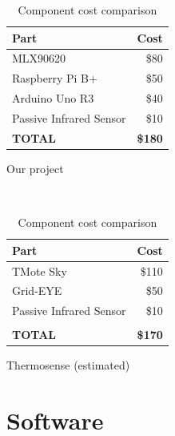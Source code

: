 \documentclass[../thesis/thesis.tex]{subfiles}
\begin{document}
\begin{table}
\centering
\begin{subtable}[b]{0.5\textwidth}
\centering
\begin{tabular}{|l|r|}
\hline
\textbf{Part} & \textbf{Cost} \\ \hline
MLX90620 & \$80 \\ \hline
Raspberry Pi B+ &  \$50 \\ \hline
Arduino Uno R3 & \$40 \\ \hline
Passive Infrared Sensor & \$10 \\ \hline
\textbf{TOTAL} & \textbf{\$180} \\ \hline
\end{tabular}
\caption{Our project}
\label{tab:sensor:cost}
\end{subtable}%
~%
\begin{subtable}[b]{0.5\textwidth}
\centering
\begin{tabular}{|l|r|}
\hline
\textbf{Part} & \textbf{Cost} \\ \hline
TMote Sky & \$110 \\ \hline
Grid-EYE & \$50 \\ \hline
Passive Infrared Sensor & \$10 \\ \hline
 & \\ \hline
\textbf{TOTAL} & \textbf{\$170} \\ \hline
\end{tabular}
\caption{Thermosense (estimated)}
\label{tab:sensor:thermosensecost}
\end{subtable}
\caption{Component cost comparison}
\end{table}


\section{Software}
\end{document}
